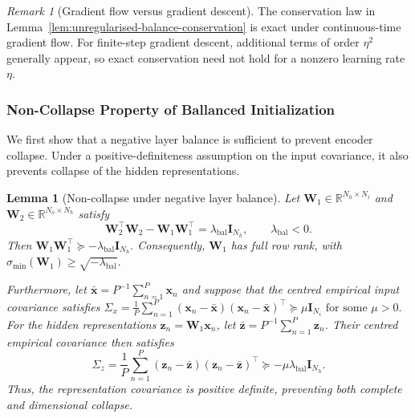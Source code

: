\documentclass{article} %
\newcommand{\wa}{\mathbf{W}_1}
\newcommand{\wb}{\mathbf{W}_2}
\newtheorem{lemma}[theorem]{Lemma}
\theoremstyle{remark}
\newtheorem{remark}[theorem]{Remark}
\begin{document}
\begin{remark}[Gradient flow versus gradient descent]
The conservation law in
Lemma~\ref{lem:unregularised-balance-conservation} is exact under
continuous-time gradient flow. For finite-step gradient descent,
additional terms of order \(\eta^2\) generally appear, so exact
conservation need not hold for a nonzero learning rate \(\eta\).
\end{remark}


\subsubsection{Non-Collapse Property of Ballanced Initialization}\label{app:noncollapse}

We first show that a negative layer balance is sufficient to prevent
encoder collapse. Under a positive-definiteness assumption on the input
covariance, it also prevents collapse of the hidden representations.
\begin{lemma}[Non-collapse under negative layer balance]
\label{lem:balanced-non-collapse}
Let $\wa\in\mathbb{R}^{N_h\times N_i}$ and
$\wb\in\mathbb{R}^{N_o\times N_h}$ satisfy
\begin{equation}
\wb^\top\wb-\wa\wa^\top
=
\lambda_{\mathrm{bal}}\mathbf{I}_{N_h},
\qquad \lambda_{\mathrm{bal}}<0.
\label{eq:negative-layer-balance}
\end{equation}
Then
$
\wa\wa^\top
\succeq
-\lambda_{\mathrm{bal}}\mathbf{I}_{N_h}.$
Consequently, $\wa$ has full row rank, with
$\sigma_{\min}(\wa)\geq\sqrt{-\lambda_{\mathrm{bal}}}$.

Furthermore, let
$\bar{\mathbf{x}}=P^{-1}\sum_{n=1}^{P}\mathbf{x}_n$
and suppose that the centred empirical input covariance satisfies $\Sigma_x
=
\frac{1}{P}\sum_{n=1}^{P}
(\mathbf{x}_n-\bar{\mathbf{x}})
(\mathbf{x}_n-\bar{\mathbf{x}})^\top
\succeq
\mu\mathbf{I}_{N_i}
\text{ for some }\mu>0.$
For the hidden representations $\mathbf{z}_n=\wa\mathbf{x}_n$,
let $\bar{\mathbf{z}}=P^{-1}\sum_{n=1}^{P}\mathbf{z}_n$.
Their centred empirical covariance then satisfies
\begin{equation}
\boxed{
\Sigma_z
=
\frac{1}{P}\sum_{n=1}^{P}
(\mathbf{z}_n-\bar{\mathbf{z}})
(\mathbf{z}_n-\bar{\mathbf{z}})^\top
\succeq
-\mu\lambda_{\mathrm{bal}}\mathbf{I}_{N_h}
}.
\label{eq:balanced-representation-non-collapse}
\end{equation}
Thus, the representation covariance is positive definite, preventing
both complete and dimensional collapse.
\end{lemma}
\end{document}
